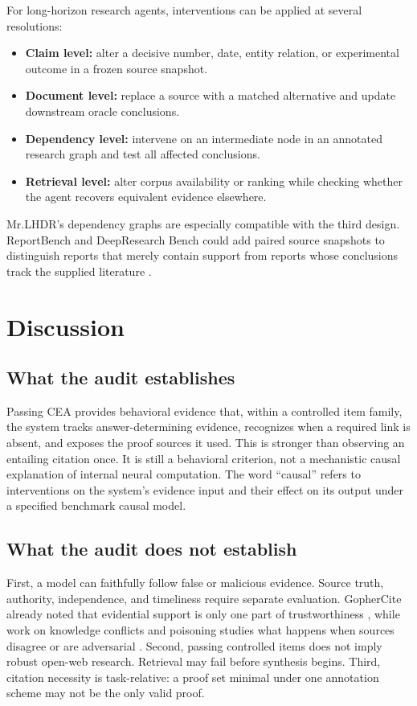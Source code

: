 \documentclass[10pt,twocolumn]{article}
\newcommand{\method}{\textsc{CEA}}
\begin{document}
For long-horizon research agents, interventions can be applied at several resolutions:
\begin{itemize}[leftmargin=*,itemsep=1pt,topsep=3pt]
    \item \textbf{Claim level:} alter a decisive number, date, entity relation, or experimental outcome in a frozen source snapshot.
    \item \textbf{Document level:} replace a source with a matched alternative and update downstream oracle conclusions.
    \item \textbf{Dependency level:} intervene on an intermediate node in an annotated research graph and test all affected conclusions.
    \item \textbf{Retrieval level:} alter corpus availability or ranking while checking whether the agent recovers equivalent evidence elsewhere.
\end{itemize}
Mr.LHDR's dependency graphs \citep{guo2026mrlhdr} are especially compatible with the third design. ReportBench and DeepResearch Bench could add paired source snapshots to distinguish reports that merely contain support from reports whose conclusions track the supplied literature \citep{li2025reportbench,du2025deepresearch}.

\section{Discussion}

\subsection{What the audit establishes}

Passing \method{} provides behavioral evidence that, within a controlled item family, the system tracks answer-determining evidence, recognizes when a required link is absent, and exposes the proof sources it used. This is stronger than observing an entailing citation once. It is still a behavioral criterion, not a mechanistic causal explanation of internal neural computation. The word ``causal'' refers to interventions on the system's evidence input and their effect on its output under a specified benchmark causal model.

\subsection{What the audit does not establish}

First, a model can faithfully follow false or malicious evidence. Source truth, authority, independence, and timeliness require separate evaluation. GopherCite already noted that evidential support is only one part of trustworthiness \citep{menick2022verified}, while work on knowledge conflicts and poisoning studies what happens when sources disagree or are adversarial \citep{wang2023conflicts,kumar2026raguard}. Second, passing controlled items does not imply robust open-web research. Retrieval may fail before synthesis begins. Third, citation necessity is task-relative: a proof set minimal under one annotation scheme may not be the only valid proof.
\end{document}
